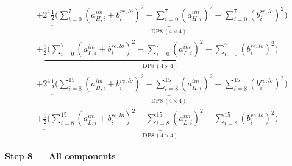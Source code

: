 \documentclass[fleqn]{article}
\newcommand{\DPop}[3]{\mathrm{DP#1}\,(#2\!\times\!#3)}
\begin{document}
\begin{align*}
  & + 2^{4}\underbrace{\tfrac{1}{2}\Big(\sum_{i=0}^{7}(a_{H,i}^{im}{+}b_i^{re,lo})^2 - \sum_{i=0}^{7}(a_{H,i}^{im})^2 - \sum_{i=0}^{7}(b_i^{re,lo})^2\Big)}_{\DPop{8}{4}{4}} \\[0.7em]
  & + \underbrace{\tfrac{1}{2}\Big(\sum_{i=0}^{7}(a_{L,i}^{im}{+}b_i^{re,lo})^2 - \sum_{i=0}^{7}(a_{L,i}^{im})^2 - \sum_{i=0}^{7}(b_i^{re,lo})^2\Big)}_{\DPop{8}{4}{4}} \\[0.7em]
  & + 2^{4}\underbrace{\tfrac{1}{2}\Big(\sum_{i=8}^{15}(a_{H,i}^{im}{+}b_i^{re,lo})^2 - \sum_{i=8}^{15}(a_{H,i}^{im})^2 - \sum_{i=8}^{15}(b_i^{re,lo})^2\Big)}_{\DPop{8}{4}{4}} \\[0.7em]
  & + \underbrace{\tfrac{1}{2}\Big(\sum_{i=8}^{15}(a_{L,i}^{im}{+}b_i^{re,lo})^2 - \sum_{i=8}^{15}(a_{L,i}^{im})^2 - \sum_{i=8}^{15}(b_i^{re,lo})^2\Big)}_{\DPop{8}{4}{4}}
\end{align*}

\textbf{Step 8 --- All components}
\end{document}
